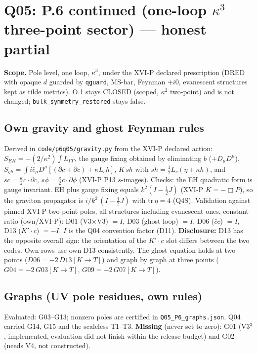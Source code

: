 \section{Q05: P.6 continued (one-loop $\kappa^3$ three-point sector) --- honest partial}
\textbf{Scope.} Pole level, one loop, $\kappa^3$, under the XVI-P declared prescription (DRED with opaque $d$ guarded by
\texttt{qguard}, MS-bar, Feynman $+i0$, evanescent structures kept as tilde metrics). O.1 stays CLOSED (scoped, $\kappa^2$
two-point) and is not changed; \texttt{bulk\_symmetry\_restored} stays false.

\subsection*{Own gravity and ghost Feynman rules}
Derived in \texttt{code/p6q05/gravity.py} from the XVI-P declared action: $S_{EH}=-(2/\kappa^2)\int L_{\Gamma\Gamma}$, the
gauge fixing obtained by eliminating $b$ ($+D_\mu D^\mu$), $S_{gh}=\int i\bar c_\mu D^\mu[(\partial c+\partial c)+\kappa L_c h]$,
$K\,s h$ with $s h=\tfrac12 L_c(\eta+\kappa h)$, and $s c=\tfrac{\kappa}{2}c\cdot\partial c$, $s\phi=\tfrac{\kappa}{2}c\cdot\partial\phi$
(XVI-P P13 $s$-images). Checks: the EH quadratic form is gauge invariant. EH plus gauge fixing equals $k^2(I-\tfrac12 J)$
(XVI-P $K=-\Box P$), so the graviton propagator is $i/k^2\,(I-\tfrac12J)$ with $\mathrm{tr}\,\eta=4$ (Q4S).
Validation against pinned XVI-P two-point poles, all structures including evanescent ones, constant ratio (own/XVI-P):
D01 (V3$\times$V3) $=I$, D03 (ghost loop) $=I$, D06 ($\bar cc$) $=I$, D13 ($K'\!\cdot c$) $=-I$.
$I$ is the Q04 convention factor (D11). \textbf{Disclosure:} D13 has the opposite overall sign: the orientation of the
$K'\!\cdot c$ slot differs between the two codes. Own rows use own D13 consistently. The ghost equation holds at two
points ($D06=-2\,D13[K\to T]$) and graph by graph at three points ($G04=-2\,G03[K\to T]$, $G09=-2\,G07[K\to T]$).

\subsection*{Graphs (UV pole residues, own rules)}
Evaluated: G03--G13; nonzero poles are certified in \texttt{Q05\_P6\_graphs.json}. Q04 carried G14, G15 and the scaleless
T1--T3. \textbf{Missing} (never set to zero): G01 (V3$^3$, implemented, evaluation did not finish within the release
budget) and G02 (needs V4, not constructed).

